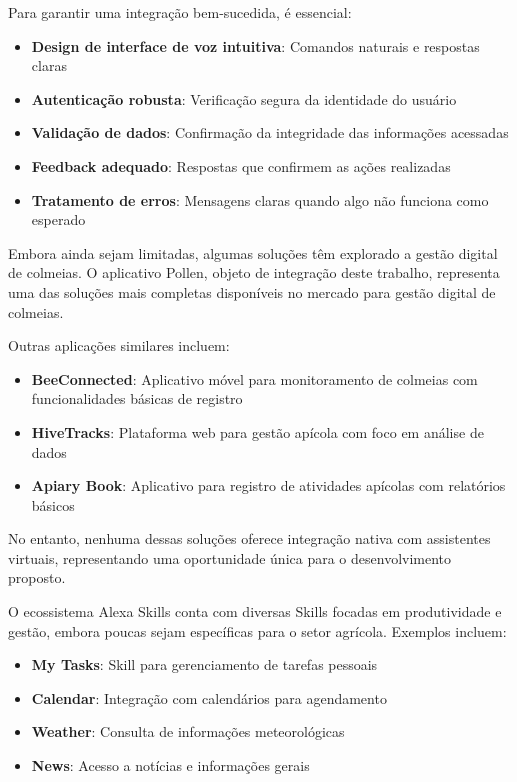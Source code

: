 Para garantir uma integração bem-sucedida, é essencial:
\begin{itemize}
    \item \textbf{Design de interface de voz intuitiva}: Comandos naturais e respostas claras
    \item \textbf{Autenticação robusta}: Verificação segura da identidade do usuário
    \item \textbf{Validação de dados}: Confirmação da integridade das informações acessadas
    \item \textbf{Feedback adequado}: Respostas que confirmem as ações realizadas
    \item \textbf{Tratamento de erros}: Mensagens claras quando algo não funciona como esperado
\end{itemize}


Embora ainda sejam limitadas, algumas soluções têm explorado a gestão digital de colmeias. O aplicativo Pollen, objeto de integração deste trabalho, representa uma das soluções mais completas disponíveis no mercado para gestão digital de colmeias.

Outras aplicações similares incluem:
\begin{itemize}
    \item \textbf{BeeConnected}: Aplicativo móvel para monitoramento de colmeias com funcionalidades básicas de registro
    \item \textbf{HiveTracks}: Plataforma web para gestão apícola com foco em análise de dados
    \item \textbf{Apiary Book}: Aplicativo para registro de atividades apícolas com relatórios básicos
\end{itemize}

No entanto, nenhuma dessas soluções oferece integração nativa com assistentes virtuais, representando uma oportunidade única para o desenvolvimento proposto.


O ecossistema Alexa Skills conta com diversas Skills focadas em produtividade e gestão, embora poucas sejam específicas para o setor agrícola. Exemplos incluem:

\begin{itemize}
    \item \textbf{My Tasks}: Skill para gerenciamento de tarefas pessoais
    \item \textbf{Calendar}: Integração com calendários para agendamento
    \item \textbf{Weather}: Consulta de informações meteorológicas
    \item \textbf{News}: Acesso a notícias e informações gerais
\end{itemize}

